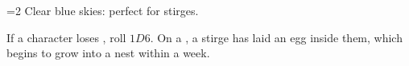 \ifnum\value{temperature}=2
  Clear blue skies: perfect for stirges.

  \stirgeSwarm

  If a character loses , roll $1D6$.
  On a , a stirge has laid an egg inside them, which begins to grow into a nest within a week.
\fi
